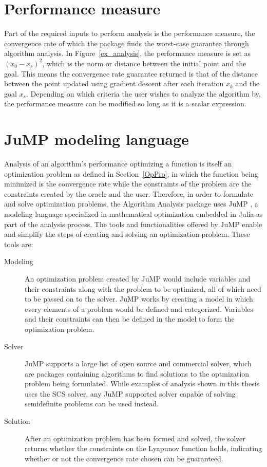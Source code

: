 \section{Performance measure}
Part of the required inputs to perform analysis is the performance measure, the convergence rate of which the package finds the worst-case guarantee through algorithm analysis. In Figure~\ref{ex_analysis}, the performance measure is set as $ (x_0 - x_s) ^2 $, which is the norm or distance between the initial point and the goal. This means the convergence rate guarantee returned is that of the distance between the point updated using gradient descent after each iteration $ x_k $ and the goal $ x_s $. Depending on which criteria the user wishes to analyze the algorithm by, the performance measure can be modified so long as it is a scalar expression.

\section{JuMP modeling language}
Analysis of an algorithm's performance optimizing a function is itself an optimization problem as defined in Section~\ref{OpPro}, in which the function being minimized is the convergence rate while the constraints of the problem are the constraints created by the oracle and the user. Therefore, in order to formulate and solve optimization problems, the Algorithm Analysis package uses JuMP \cite{jump}, a modeling language specialized in mathematical optimization embedded in Julia as part of the analysis process. The tools and functionalities offered by JuMP enable and simplify the steps of creating and solving an optimization problem. These tools are:

\begin{description}
	\item[Modeling] An optimization problem created by JuMP would include variables and their constraints along with the problem to be optimized, all of which need to be passed on to the solver. JuMP works by creating a model in which every elements of a problem would be defined and categorized. Variables and their constraints can then be defined in the model to form the optimization problem.
	\item[Solver] JuMP supports a large list of open source and commercial solver, which are packages containing algorithms to find solutions to the optmization problem being formulated. While examples of analysis shown in this thesis uses the SCS \cite{SCS} solver, any JuMP supported solver capable of solving semidefinite problems can be used instead.
	\item[Solution] After an optimization problem has been formed and solved, the solver returns whether the constraints on the Lyapunov function holds, indicating whether or not the convergence rate chosen can be guaranteed. 	 
\end{description}

